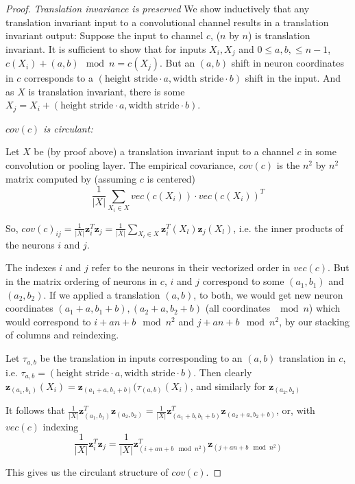 \documentclass{article} %
\begin{document}
\begin{proof}

\textit{Translation invariance is preserved} We show inductively that any translation invariant input to a convolutional channel results in a translation invariant output: Suppose the input to channel $c$, ($n$ by $n$) is translation invariant. It is sufficient to show that for inputs $X_i, X_j$ and $0 \leq a,b, \leq n-1$, $c(X_i) + (a,b) \mod n = c(X_j)$. But an $(a,b)$ shift in neuron coordinates in $c$ corresponds to a $(\text{height stride}\cdot a, \text{width stride}\cdot b)$ shift in the input. And as $X$ is translation invariant, there is some $X_j = X_i + (\text{height stride}\cdot a, \text{width stride}\cdot b)$.

\textit{$cov(c)$ is circulant:}

Let $X$ be (by proof above) a translation invariant input to a channel $c$ in some convolution or pooling layer. The empirical covariance, $cov(c)$ is the $n^2$ by $n^2$ matrix computed by (assuming $c$ is centered)
\[ \frac{1}{|X|} \sum_{X_i \in X} vec(c(X_i)) \cdot vec(c(X_i))^T \]

So, $cov(c)_{ij} = \frac{1}{|X|} \pmb{z}_{i}^T \pmb{z}_j = \frac{1}{|X|} \sum_{X_l \in X} \pmb{z}_{i}^T(X_l) \pmb{z}_j(X_l) $, i.e. the inner products of the neurons $i$ and $j$.

The indexes $i$ and $j$ refer to the neurons in their vectorized order in $vec(c)$. But in the matrix ordering of neurons in $c$, $i$ and $j$ correspond to some $(a_1, b_1)$ and $(a_2, b_2)$. If we applied a translation $(a,b)$, to both, we would get new neuron coordinates $(a_1 +a, b_1 + b), (a_2 + a, b_2 + b)$ (all coordinates $\mod n$) which would correspond to $i + an + b \mod n^2 $ and $j + an + b \mod n^2$, by our stacking of columns and reindexing.

Let $\tau_{a,b}$ be the translation in inputs corresponding to an $(a,b)$ translation in $c$, i.e. $\tau_{a,b} = (\text{height stride}\cdot a, \text{width stride}\cdot b)$. Then clearly $\pmb{z}_{(a_1, b_1)}(X_i) = \pmb{z}_{(a_1 + a, b_1 + b)}(\tau_{(a,b)}(X_i) $, and similarly for $\pmb{z}_{(a_2, b_2)}$

It follows that $\frac{1}{|X|} \pmb{z}_{(a_1, b_1)}^T \pmb{z}_{(a_2, b_2)} = \frac{1}{|X|} \pmb{z}_{(a_1 + b, b_1 + b)}^T \pmb{z}_{(a_2 +a , b_2 + b)}$, or, with $vec(c)$ indexing
\[ \frac{1}{|X|} \pmb{z}_{i}^T \pmb{z}_j = \frac{1}{|X|} \pmb{z}_{(i + an + b \mod n^2)}^T \pmb{z}_{(j + an + b \mod n^2)} \]

This gives us the circulant structure of $cov(c)$.


\end{proof}
\end{document}
